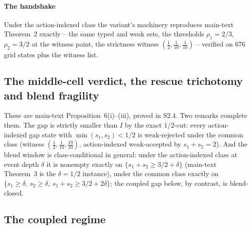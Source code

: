 \documentclass[preprint,11pt,authoryear]{elsarticle}
\theoremstyle{remark}
\begin{document}
\paragraph{The handshake} Under the action-indexed class the variant's machinery reproduces main-text Theorem~2 exactly -- the same typed and weak sets, the thresholds $\rho_1=2/3$, $\rho_2=3/2$ at the witness point, the strictness witness $(\tfrac12,\tfrac1{10},\tfrac1{10})$ -- verified on 676 grid states plus the witness list.

\subsection{The middle-cell verdict, the rescue trichotomy and blend fragility}

These are main-text Proposition~6(i)--(iii), proved in S2.4. Two remarks complete them. The gap is strictly smaller than $I$ by the exact $1/2$-cut: every action-indexed gap state with $\min(s_1,s_2)<1/2$ is weak-rejected under the common class (witness $(\tfrac12,\tfrac1{10},\tfrac{19}{10})$, action-indexed weak-accepted by $s_1+s_2=2$). And the blend window is class-conditional in general: under the action-indexed class at event depth $\delta$ it is nonempty exactly on $\{s_1+s_2\ge3/2+\delta\}$ (main-text Theorem~3 is the $\delta=1/2$ instance), under the common class exactly on $\{s_1\ge\delta,\ s_2\ge\delta,\ s_1+s_2\ge3/2+2\delta\}$; the coupled gap below, by contrast, is blend-closed.

\subsection{The coupled regime}
\end{document}
